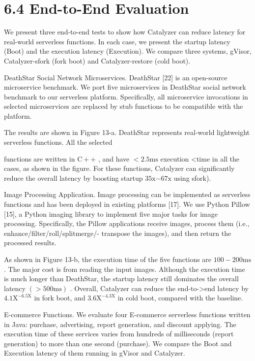 \documentclass[
  10
]{article}
\begin{document}
\section{6.4 End-to-End Evaluation}\label{end-to-end-evaluation}

We present three end-to-end tests to show how Catalyzer can reduce
latency for real-world serverless functions. In each case, we present
the startup latency (Boot) and the execution latency (Execution). We
compare three systems, gVisor, Catalyzer-sfork (fork boot) and
Catalyzer-restore (cold boot).

DeathStar Social Network Microservices. DeathStar {[}22{]} is an
open-source microservice benchmark. We port five microservices in
DeathStar social network benchmark to our serverless platform.
Specifically, all microservice invocations in selected microservices are
replaced by stub functions to be compatible with the platform.

The results are shown in Figure 13-a. DeathStar represents real-world
lightweight serverless functions. All the selected

functions are written in \(\mathrm { C } { + } { + }\) , and have
\(< 2 . 5 \mathrm { m s }\) execution \textless time in all the cases,
as shown in the figure. For these functions, Catalyzer can significantly
reduce the overall latency by boosting startup
\(3 5 \mathrm { x } \mathrm { - } 6 7 \mathrm { x }\) using sfork).

Image Processing Application. Image processing can be implemented as
serverless functions and has been deployed in existing platforms
{[}17{]}. We use Python Pillow {[}15{]}, a Python imaging library to
implement five major tasks for image processing. Specifically, the
Pillow applications receive images, process them (i.e.,
enhance/filter/roll/splitmerge/- transpose the images), and then return
the processed results.

As shown in Figure 13-b, the execution time of the five functions are
\(1 0 0 { - } 2 0 0 \mathrm { m s }\) . The major cost is from reading
the input images. Although the execution time is much longer than
DeathStar, the startup latency still dominates the overall latency
\(\left( > 5 0 0 \mathrm { m s } \right)\) . Overall, Catalyzer can
reduce the end-to-\textgreater end latency by
\(4 . 1 \mathrm { X } ^ { - 6 . 5 \mathrm { X } }\) in fork boot, and
\(3 . 6 \mathrm { X } ^ { - 4 . 3 \mathrm { X } }\) in cold boot,
compared with the baseline.

E-commerce Functions. We evaluate four E-commerce serverless functions
written in Java: purchase, advertising, report generation, and discount
applying. The execution time of these services varies from hundreds of
milliseconds (report generation) to more than one second (purchase). We
compare the Boot and Execution latency of them running in gVisor and
Catalyzer.
\end{document}
